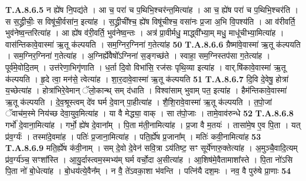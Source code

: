 \documentclass[17pt]{extarticle}
\begin{document}
                                                                  \textbf{ T.A.8.6.5} \newline
                  न ह्ये॑ष नि॒पद्य॑ते । आ च॒ परा॑ च प॒थिभि॒श्चर॑न्त॒मित्या॑ह । आ च॒ ह्ये॑ष परा॑ च प॒थिभि॒श्चर॑ति । स स॒द्ध्रीचीः॒ स विषू॑ची॒र्वसा॑न॒ इत्या॑ह । स॒द्ध्रीची᳚श्च॒ ह्ये॑ष विषू॑चीश्च॒ वसा॑नः प्र॒जा अ॒भि वि॒पश्य॑ति । आ व॑रीवर्ति॒ भुव॑नेष्व॒न्तरित्या॑ह । आ ह्ये॑ष व॑री॒वर्ति॒ भुव॑नेष्व॒न्तः । अत्र॑ प्रा॒वीर्मधु॒ माद्ध्वी᳚भ्या॒म् मधु॒ माधू॑चीभ्या॒मित्या॑ह ।  वास॑न्तिकावे॒वास्मा॑ ऋ॒तू क॑ल्पयति ।  सम॒ग्निर॒ग्निना॑ ग॒तेत्या॑ह \textbf{ 50} \newline
                  \newline
                                                                  \textbf{ T.A.8.6.6} \newline
                  ग्रैष्मा॑वे॒वास्मा॑ ऋ॒तू क॑ल्पयति । सम॒ग्निर॒ग्निना॑ ग॒तेत्या॑ह । अ॒ग्निर्ह्ये॑वैषो᳚ऽग्निना॑ स॒ङ्गच्छ॑ते । स्वाहा॒ सम॒ग्निस्तप॑सा ग॒तेत्या॑ह ।  पूर्व॑मे॒वोदि॒तम् । उत्त॑रेणा॒भिगृ॑णाति ।  ध॒र्ता दि॒वो विभा॑सि॒ रज॑सः पृथि॒व्या इत्या॑ह ।  वार्.षि॑कावे॒वास्मा॑ ऋ॒तू क॑ल्पयति ।  हृ॒दे त्वा॒ मन॑से॒ त्वेत्या॑ह । शा॒र॒दावे॒वास्मा॑ ऋ॒तू क॑ल्पयति \textbf{ 51} \newline
                  \newline
                                                                  \textbf{ T.A.8.6.7} \newline
                  दि॒वि दे॒वेषु॒ होत्रा॑ य॒च्छेत्या॑ह । होत्रा॑भिरे॒वेमान् ॅलो॒कान्थ् सम् द॑धाति । विश्वा॑साम् भुवाम् पत॒ इत्या॑ह । हैम॑न्तिकावे॒वास्मा॑ ऋ॒तू क॑ल्पयति ।  दे॒व॒श्रूस्त्वम् दे॑व घर्म दे॒वान् पा॒हीत्या॑ह ।  शै॒शि॒रावे॒वास्मा॑ ऋ॒तू क॑ल्पयति ।  त॒पो॒जां ॅवाच॑म॒स्मे निय॑च्छ देवा॒युव॒मित्या॑ह ।  या वै मेद्ध्या॒ वाक् । सा त॑पो॒जाः । तामे॒वाव॑रुन्धे \textbf{ 52} \newline
                  \newline
                                                                  \textbf{ T.A.8.6.8} \newline
                  गर्भो॑ दे॒वाना॒मित्या॑ह । गर्भो॒ ह्ये॑ष दे॒वाना᳚म् । पि॒ता म॑ती॒नामित्या॑ह । प्र॒जा वै म॒तयः॑ । तासा॑मे॒ष ए॒व पि॒ता । यत् प्र॑व॒र्ग्यः॑ ।  तस्मा॑दे॒वमा॑ह । पतिः॑ प्र॒जाना॒मित्या॑ह । पति॒र्ह्ये॑ष प्र॒जाना᳚म् । मतिः॑ कवी॒नामित्या॑ह \textbf{ 53} \newline
                  \newline
                                                                  \textbf{ T.A.8.6.9} \newline
                  मति॒र्ह्ये॑ष क॑वी॒नाम् । सम् दे॒वो दे॒वेन॑ सवि॒त्रा ऽय॑तिष्ट॒ सꣳ सूर्ये॑णारु॒क्तेत्या॑ह ।  अ॒मुञ्चै॒वादि॒त्यम् प्र॑व॒र्ग्य॑ञ्च॒ सꣳशा᳚स्ति ।  आ॒यु॒र्दास्त्वम॒स्मभ्य॑म् घर्म वर्चो॒दा अ॒सीत्या॑ह ।  आ॒शिष॑मे॒वैतामाशा᳚स्ते । पि॒ता नो॑ऽसि पि॒ता नो॑ बो॒धेत्या॑ह । बो॒धय॑त्ये॒वैन᳚म् । न वै॒ ते॑ऽवका॒शा भ॑वन्ति । पत्नि॑यै दश॒मः ।  नव॒ वै पुरु॑षे प्रा॒णाः \textbf{ 54} \newline
\end{document}
